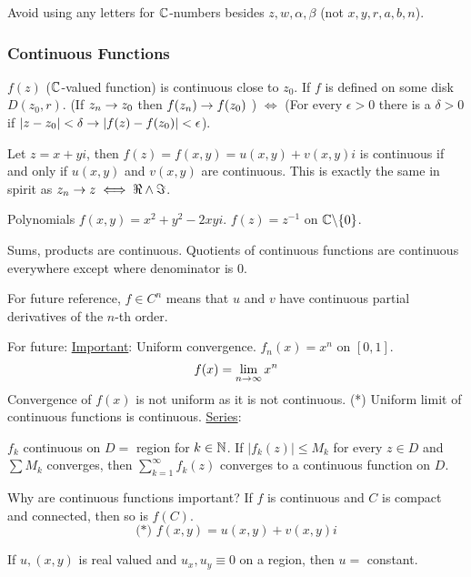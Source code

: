 \documentclass[]{article}
\begin{document}
\begin{remark}
	Avoid using any letters for $\mathbb{C}$-numbers besides $z,w,\alpha,\beta$ (not $x,y,r,a,b,n$).
\end{remark}

\subsubsection{Continuous Functions}
\begin{definition}
	$f(z)$ ($\mathbb{C}$-valued function) is continuous close to $z_0$. If $f$ is defined on some disk $D(z_0,r)$. (If $z_n\rightarrow z_0$ then $f(z_n)\rightarrow f(z_0)$ ) $\iff$ (For every $\epsilon > 0$ there is a $\delta>0$ if $|z-z_0|<\delta \rightarrow |f(z)-f(z_0)|<\epsilon$).
\end{definition}

Let $z=x+yi$, then $f(z)=f(x,y) = u(x,y) + v(x,y)i$ is continuous if and only if $u(x,y)$ and $v(x,y)$ are continuous. This is exactly the same in spirit as $z_n\rightarrow z \iff \Re \land \Im$.

\begin{example}
	Polynomials $f(x,y) = x^2 + y^2 - 2xyi$. $f(z) = z^{-1}$ on $\mathbb{C} \backslash \{0\}$.
\end{example}
Sums, products are continuous. Quotients of continuous functions are continuous everywhere except where denominator is 0.

For future reference, $f\in C^n$ means that $u$ and $v$ have continuous partial derivatives of the $n$-th order.

For future: \underline{Important}: Uniform convergence. $f_n(x) = x^n$ on $[0,1]$. $$f(x)=\lim_{n\rightarrow \infty} x^n$$ Convergence of $f(x)$ is not uniform as it is  not continuous.
(*) Uniform limit of continuous functions is continuous.
\underline{Series}:%
\begin{theorem}
	$f_k$ continuous on $D = $ region for $k\in\mathbb{N}$. If $|f_k(z)|\leq M_k$ for every $z\in D$ and $\sum M_k$ converges, then $\sum_{k=1}^\infty f_k(z)$ converges to a continuous function on $D$.
\end{theorem}
Why are continuous functions important? If $f$ is continuous and $C $ is compact and connected, then so is $f(C)$.
\begin{equation*}
	\text{(*) }f(x,y) = u(x,y)+v(x,y)i
\end{equation*}

\begin{theorem}
	If $u,(x,y)$ is real valued and $u_x,u_y\equiv 0$ on a region, then $u=$ constant.
\end{theorem}
\end{document}

